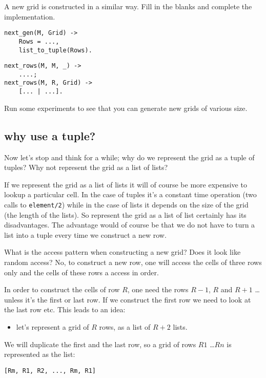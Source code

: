 \documentclass[a4paper,11pt]{article}
\begin{document}
A new grid is constructed in a similar way. Fill in the blanks and
complete the implementation. 

\begin{verbatim}
next_gen(M, Grid) ->
    Rows = ...,
    list_to_tuple(Rows).
\end{verbatim}

\begin{verbatim}
next_rows(M, M, _) ->
    ....;
next_rows(M, R, Grid) ->
    [... | ...].
\end{verbatim}

Run some experiments to see that you can generate new grids of various
size.

\subsection{why use a tuple?}

Now let's stop and think for a while; why do we represent the grid as
a tuple of tuples? Why not represent the grid as a list of lists? 

If we represent the grid as a list of lists it will of course be more
expensive to lookup a particular cell. In the case of tuples it's a
constant time operation (two calls to {\tt element/2}) while in the
case of lists it depends on the size of the grid (the length of the
lists). So represent the grid as a list of list certainly has its
disadvantages. The advantage would of course be that we do not have to
turn a list into a tuple every time we construct a new row.

What is the access pattern when constructing a new grid? Does it look
like random access? No, to construct a new row, one will access the
cells of three rows only and the cells of these rows a access in
order. 

In order to construct the cells of row $R$, one need the rows $R-1$,
$R$ and $R+1$ \ldots unless it's the first or last row. If we
construct the first row we need to look at the last row etc. This
leads to an idea:

\begin{itemize}
\item let's represent a grid of $R$ rows, as a list of $R+2$ lists.
\end{itemize}

We will duplicate the first and the last row, so a grid of rows $R1$
\ldots $Rn$ is represented as the list:

\begin{verbatim}
[Rm, R1, R2, ..., Rm, R1]
\end{verbatim}
\end{document}
